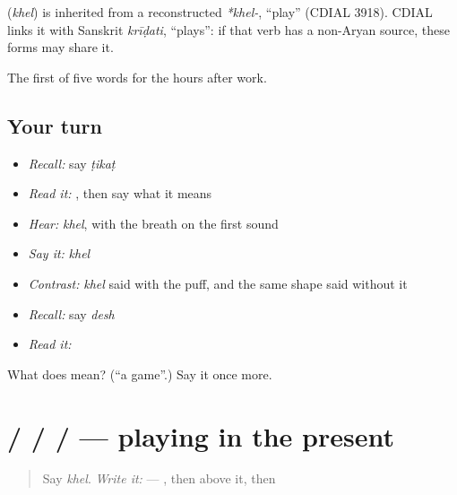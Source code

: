 \begin{cousinweb}
\textbf{} (\emph{khel}) is inherited from a reconstructed \emph{*khel-}, \textquotedblleft{}play\textquotedblright{} (CDIAL 3918). CDIAL links it with Sanskrit \emph{krīḍati}, \textquotedblleft{}plays\textquotedblright{}: if that verb has a non-Aryan source, these forms may share it.
\end{cousinweb}

\begin{grammarlens}[title={What you've built}]
The first of five words for the hours after work.
\end{grammarlens}

\subsection*{Your turn}
\begin{itemize}
\raggedright
  \item \emph{Recall:} say \emph{ṭikaṭ}
  \item \emph{Read it:} \textbf{}, then say what it means
  \item \emph{Hear:} \emph{khel}, with the breath on the first sound
  \item \emph{Say it:} \emph{khel}
  \item \emph{Contrast:} \emph{khel} said with the puff, and the same shape said without it
  \item \emph{Recall:} say \emph{desh}
  \item \emph{Read it:} \textbf{}
\end{itemize}

\begin{tcolorbox}[breakable,colback=teal!4,colframe=teal!35!black,title={Before you move on}]
What does  mean? (\textquotedblleft{}a game\textquotedblright{}.) Say it once more.
\end{tcolorbox}
\section[\texorpdfstring{\hi{खेलना} / \hi{खेलता} … (khelnā / kheltā …)}{खेलना / खेलता … (khelnā / kheltā …)}]{ /  /  /  — playing in the present}

\label{lesson:HI-C70-play}



\begin{quote}
Say \emph{khel}. \emph{Write it:} \textbf{} — , then  above it, then 
\end{quote}

